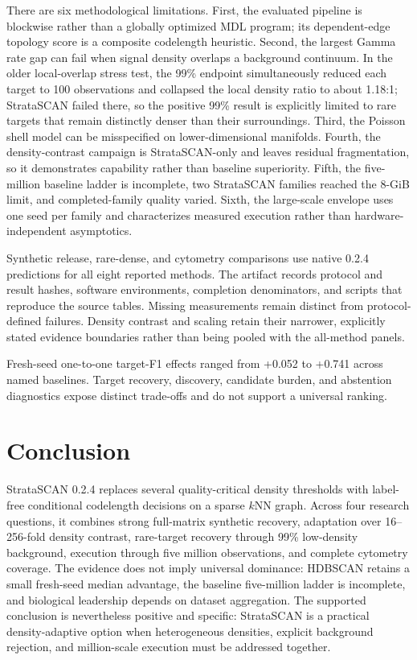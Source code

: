 \documentclass[conference]{IEEEtran}
\newcommand{\method}{StrataSCAN}
\begin{document}
There are six methodological limitations. First, the evaluated pipeline is blockwise rather than a globally optimized MDL program; its dependent-edge topology score is a composite codelength heuristic. Second, the largest Gamma rate gap can fail when signal density overlaps a background continuum. In the older local-overlap stress test, the 99\% endpoint simultaneously reduced each target to 100 observations and collapsed the local density ratio to about 1.18:1; StrataSCAN failed there, so the positive 99\% result is explicitly limited to rare targets that remain distinctly denser than their surroundings. Third, the Poisson shell model can be misspecified on lower-dimensional manifolds. Fourth, the density-contrast campaign is StrataSCAN-only and leaves residual fragmentation, so it demonstrates capability rather than baseline superiority. Fifth, the five-million baseline ladder is incomplete, two StrataSCAN families reached the 8-GiB limit, and completed-family quality varied. Sixth, the large-scale envelope uses one seed per family and characterizes measured execution rather than hardware-independent asymptotics.

Synthetic release, rare-dense, and cytometry comparisons use native 0.2.4 predictions for all eight reported methods. The artifact records protocol and result hashes, software environments, completion denominators, and scripts that reproduce the source tables. Missing measurements remain distinct from protocol-defined failures. Density contrast and scaling retain their narrower, explicitly stated evidence boundaries rather than being pooled with the all-method panels.

Fresh-seed one-to-one target-F1 effects ranged from +0.052 to +0.741 across named baselines. Target recovery, discovery, candidate burden, and abstention diagnostics expose distinct trade-offs and do not support a universal ranking.

\section{Conclusion}
\method{} 0.2.4 replaces several quality-critical density thresholds with label-free conditional codelength decisions on a sparse $k$NN graph. Across four research questions, it combines strong full-matrix synthetic recovery, adaptation over 16--256-fold density contrast, rare-target recovery through 99\% low-density background, execution through five million observations, and complete cytometry coverage. The evidence does not imply universal dominance: HDBSCAN retains a small fresh-seed median advantage, the baseline five-million ladder is incomplete, and biological leadership depends on dataset aggregation. The supported conclusion is nevertheless positive and specific: StrataSCAN is a practical density-adaptive option when heterogeneous densities, explicit background rejection, and million-scale execution must be addressed together.
\end{document}
